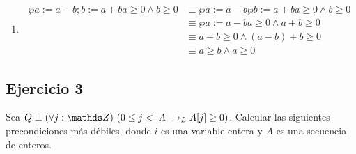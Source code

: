 \begin{enumerate}[label=\alph*)]
    \item \begin{align*}
              \wp{a := a-b; b := a+b}{a \geq 0 \land b \geq 0} & \equiv \wp{a := a-b}{\wp{b := a+b}{a \geq 0 \land b \geq 0}} \\
                                                               & \equiv \wp{a := a-b}{a \geq 0 \land a+b \geq 0}              \\
                                                               & \equiv a-b \geq 0 \land (a-b)+b \geq 0                       \\
                                                               & \equiv \boxed{a \geq b \land a \geq 0}
          \end{align*}
\end{enumerate}

\subsection{Ejercicio 3}
Sea $Q \equiv \paraTodo{j}{\ent}{0 \leq j < |A| \thenLuego A[j] \geq 0}$. Calcular las siguientes precondiciones más débiles, donde $i$ es una variable entera y $A$ es una secuencia de enteros.


